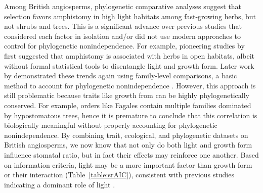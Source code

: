 \documentclass[12pt, oneside]{article}
\begin{document}
Among British angiosperms, phylogenetic comparative analyses suggest that selection favors amphistomy in high light habitats among fast-growing herbs, but not shrubs and trees. This is a significant advance over previous studies that considered each factor in isolation and/or did not use modern approaches to control for phylogenetic nonindependence. For example, pioneering studies by \cite{Salisbury_1927} first suggested that amphistomy is associated with herbs in open habitats, albeit without formal statistical tools to disentangle light and growth form. Later work by \cite{Peat_Fitter_1994b} demonstrated these trends again using family-level comparisons, a basic method to account for phylogenetic nonindependence \citep[see also][]{Mott_etal_1982, Beerling_Kelly_1996}. However, this approach is still problematic because traits like growth from can be highly phylogenetically conserved. For example, orders like Fagales contain multiple families dominated by hypostomatous trees, hence it is premature to conclude that this correlation is biologically meaningful without properly accounting for phylogenetic nonindependence. By combining trait, ecological, and phylogenetic datasets on British angiosperms, we now know that not only do both light and growth form influence stomatal ratio, but in fact their effects may reinforce one another. Based on information criteria, light may be a more important factor than growth form or their interaction (Table~\ref{table:srAIC}), consistent with previous studies indicating a dominant role of light \citep{Mott_etal_1982, Jordan_etal_2014, Bucher_etal_2017}.
\end{document}

